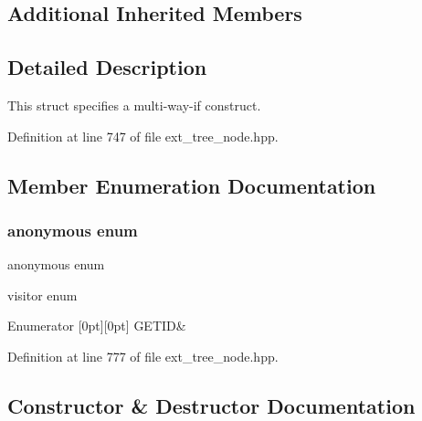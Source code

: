 \subsection*{Additional Inherited Members}


\subsection{Detailed Description}
This struct specifies a multi-\/way-\/if construct. 

Definition at line 747 of file ext\+\_\+tree\+\_\+node.\+hpp.



\subsection{Member Enumeration Documentation}
\mbox{\label{structgimple__multi__way__if_a53ea1bd8d2f872fd1b78cddd08db9b26}} 
\subsubsection{\texorpdfstring{anonymous enum}{anonymous enum}}
{\footnotesize\ttfamily anonymous enum}



visitor enum 

\begin{DoxyEnumFields}{Enumerator}
[0pt][0pt]{}\mbox{\label{structgimple__multi__way__if_a53ea1bd8d2f872fd1b78cddd08db9b26a2c1dac7cb088ca3c77e571964fdc3ea9}} 
G\+E\+T\+ID&\\
\hline

\end{DoxyEnumFields}


Definition at line 777 of file ext\+\_\+tree\+\_\+node.\+hpp.



\subsection{Constructor \& Destructor Documentation}
\mbox{\label{structgimple__multi__way__if_a4bc28b63923822ab5debc65ae1f4b12e}} 
